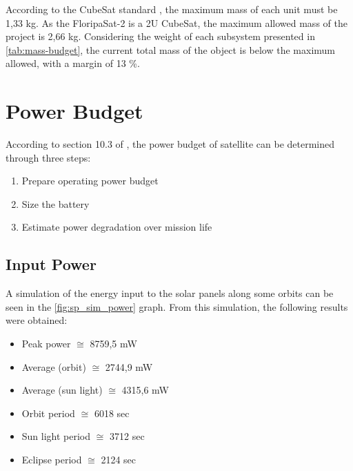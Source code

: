 According to the CubeSat standard \cite{cds}, the maximum mass of each unit must be 1,33 kg. As the FloripaSat-2 is a 2U CubeSat, the maximum allowed mass of the project is 2,66 kg. Considering the weight of each subsystem presented in \autoref{tab:mass-budget}, the current total mass of the object is below the maximum allowed, with a margin of 13 \%.

\section{Power Budget} \label{power-budget}

According to section 10.3 of \cite{larson2005}, the power budget of satellite can be determined through three steps:

\begin{enumerate}
    \item Prepare operating power budget
    \item Size the battery
    \item Estimate power degradation over mission life
\end{enumerate}

\subsection{Input Power}

A simulation of the energy input to the solar panels along some orbits can be seen in the \autoref{fig:sp_sim_power} graph. From this simulation, the following results were obtained:

\begin{itemize}
    \item Peak power $\cong$ 8759,5 mW
    \item Average (orbit) $\cong$ 2744,9 mW
    \item Average (sun light) $\cong$ 4315,6 mW
    \item Orbit period $\cong$ 6018 sec
    \item Sun light period $\cong$ 3712 sec
    \item Eclipse period $\cong$ 2124 sec
\end{itemize}

